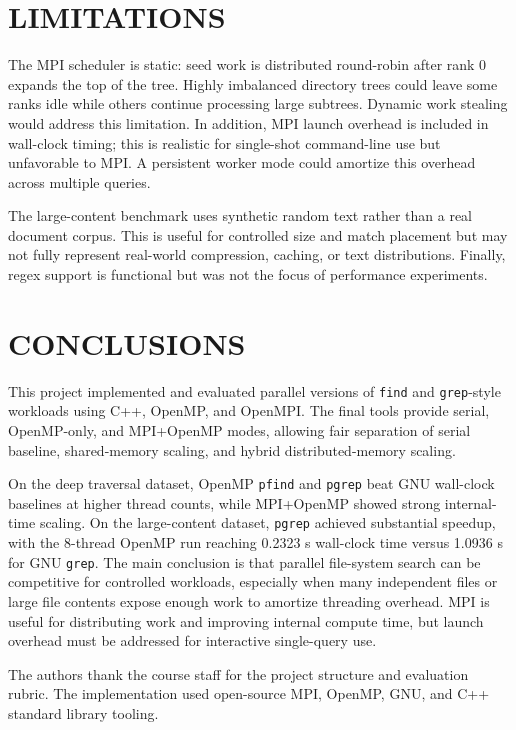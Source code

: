 \documentclass[twocolumn,10pt]{asme2e}
\begin{document}
\section*{LIMITATIONS}

The MPI scheduler is static: seed work is distributed round-robin after rank 0 expands the top of the tree. Highly imbalanced directory trees could leave some ranks idle while others continue processing large subtrees. Dynamic work stealing would address this limitation. In addition, MPI launch overhead is included in wall-clock timing; this is realistic for single-shot command-line use but unfavorable to MPI. A persistent worker mode could amortize this overhead across multiple queries.

The large-content benchmark uses synthetic random text rather than a real document corpus. This is useful for controlled size and match placement but may not fully represent real-world compression, caching, or text distributions. Finally, regex support is functional but was not the focus of performance experiments.

\section*{CONCLUSIONS}

This project implemented and evaluated parallel versions of \texttt{find} and \texttt{grep}-style workloads using C++, OpenMP, and OpenMPI. The final tools provide serial, OpenMP-only, and MPI+OpenMP modes, allowing fair separation of serial baseline, shared-memory scaling, and hybrid distributed-memory scaling.

On the deep traversal dataset, OpenMP \texttt{pfind} and \texttt{pgrep} beat GNU wall-clock baselines at higher thread counts, while MPI+OpenMP showed strong internal-time scaling. On the large-content dataset, \texttt{pgrep} achieved substantial speedup, with the 8-thread OpenMP run reaching 0.2323 s wall-clock time versus 1.0936 s for GNU \texttt{grep}. The main conclusion is that parallel file-system search can be competitive for controlled workloads, especially when many independent files or large file contents expose enough work to amortize threading overhead. MPI is useful for distributing work and improving internal compute time, but launch overhead must be addressed for interactive single-query use.

\balance
\begin{acknowledgment}
The authors thank the course staff for the project structure and evaluation rubric. The implementation used open-source MPI, OpenMP, GNU, and C++ standard library tooling.
\end{acknowledgment}
\end{document}
